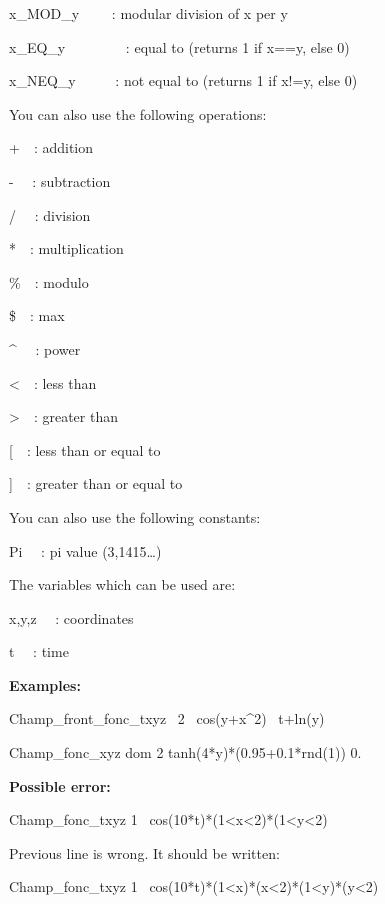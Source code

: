 x\_MOD\_y \ \ \ \ : modular division of x per y

x\_EQ\_y \ \ \ \ \ \ \ \ : equal to (returns 1 if x==y, else 0)

x\_NEQ\_y \ \ \ \ \ : not equal to (returns 1 if x!=y, else 0) 


\bigskip

You can also use the following operations:

+\ \ : addition

{}- \ \ : subtraction

/ \ \ : division

*\ \ : multiplication

\%\ \ : modulo

\$\ \ : max

\^{} \ \ : power

{\textless}\ \ : less than

{\textgreater}\ \ : greater than

[\ \ : less than or equal to

]\ \ : greater than or equal to


\bigskip

You can also use the following constants:

Pi \ \ : pi value (3,1415{\dots})


\bigskip

The variables which can be used are:

x,y,z \ \ : coordinates 

t \ \ : time


\bigskip

{\bfseries
Examples:}

Champ\_front\_fonc\_txyz \ 2 \ cos(y+x\^{}2) \ t+ln(y)

Champ\_fonc\_xyz dom 2 tanh(4*y)*(0.95+0.1*rnd(1)) 0.


\bigskip

{\bfseries
Possible error:}

Champ\_fonc\_txyz 1 \ cos(10*t)*(1{\textless}x{\textless}2)*(1{\textless}y{\textless}2)

Previous line is wrong. It should be written:

Champ\_fonc\_txyz 1 \ cos(10*t)*(1{\textless}x)*(x{\textless}2)*(1{\textless}y)*(y{\textless}2)
